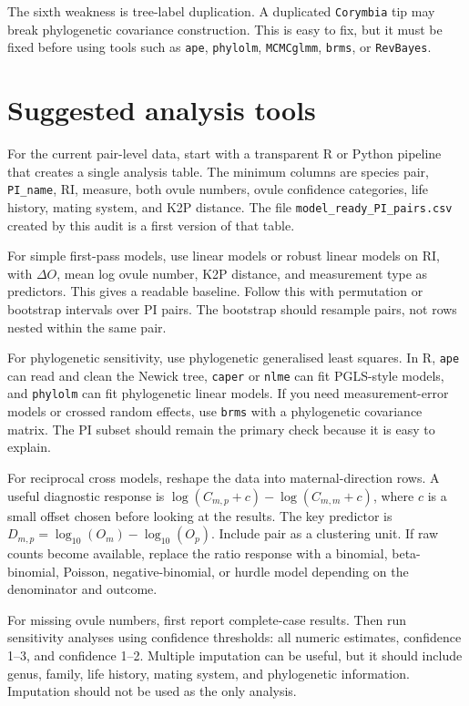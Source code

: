 \documentclass[11pt]{article}
\begin{document}
The sixth weakness is tree-label duplication. A duplicated \texttt{Corymbia} tip may break phylogenetic covariance construction. This is easy to fix, but it must be fixed before using tools such as \texttt{ape}, \texttt{phylolm}, \texttt{MCMCglmm}, \texttt{brms}, or \texttt{RevBayes}.

\section*{Suggested analysis tools}

For the current pair-level data, start with a transparent R or Python pipeline that creates a single analysis table. The minimum columns are species pair, \texttt{PI\_name}, RI, measure, both ovule numbers, ovule confidence categories, life history, mating system, and K2P distance. The file \texttt{model\_ready\_PI\_pairs.csv} created by this audit is a first version of that table.

For simple first-pass models, use linear models or robust linear models on RI, with \(\Delta O\), mean log ovule number, K2P distance, and measurement type as predictors. This gives a readable baseline. Follow this with permutation or bootstrap intervals over PI pairs. The bootstrap should resample pairs, not rows nested within the same pair.

For phylogenetic sensitivity, use phylogenetic generalised least squares. In R, \texttt{ape} can read and clean the Newick tree, \texttt{caper} or \texttt{nlme} can fit PGLS-style models, and \texttt{phylolm} can fit phylogenetic linear models. If you need measurement-error models or crossed random effects, use \texttt{brms} with a phylogenetic covariance matrix. The PI subset should remain the primary check because it is easy to explain.

For reciprocal cross models, reshape the data into maternal-direction rows. A useful diagnostic response is \(\log(C_{m,p} + c) - \log(C_{m,m} + c)\), where \(c\) is a small offset chosen before looking at the results. The key predictor is \(D_{m,p} = \log_{10}(O_m)-\log_{10}(O_p)\). Include pair as a clustering unit. If raw counts become available, replace the ratio response with a binomial, beta-binomial, Poisson, negative-binomial, or hurdle model depending on the denominator and outcome.

For missing ovule numbers, first report complete-case results. Then run sensitivity analyses using confidence thresholds: all numeric estimates, confidence 1--3, and confidence 1--2. Multiple imputation can be useful, but it should include genus, family, life history, mating system, and phylogenetic information. Imputation should not be used as the only analysis.
\end{document}
